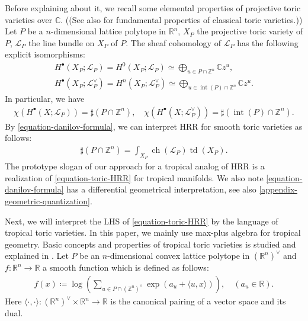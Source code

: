 \documentclass[a4paper,dvipdfmx,reqno,12pt]{amsart}
\theoremstyle{definition}
\newcommand{\deq}{\coloneqq}
\newcommand{\opn}[1]{\operatorname{#1}}
\newcommand{\abk}[1]{\langle {#1} \rangle}%
\numberwithin{equation}{section}
\begin{document}
Before explaining about it, we recall some 
elemental properties of projective toric varieties over 
$\mathbb{C}$.
((See also \cite{MR2810322} for fundamental
properties of classical toric varieties.))
Let $P$ be a $n$-dimensional lattice polytope in 
$\mathbb{R}^{n}$, $X_P$ the projective toric variety
of $P$, $\mathcal{L}_P$ the line bundle on 
$X_P$ of $P$.
The sheaf cohomology of $\mathcal{L}_P$ has 
the following explicit isomorphisms:
\begin{align}
H^{\bullet}(X_P;\mathcal{L}_P)=
H^{0}(X_P;\mathcal{L}_P)\simeq
\bigoplus_{u\in P\cap \mathbb{Z}^{n}} \mathbb{C}z^{u},
\label{equation-danilov-formula} \\
H^{\bullet}(X_P;\mathcal{L}_P^{\vee})=
H^{n}(X_P;\mathcal{L}_P^{\vee})\simeq 
\bigoplus_{u\in \opn{int}(P)\cap \mathbb{Z}^{n}}\mathbb{C}z^{u}.
\end{align}
In particular, we have
\begin{align} \label{equation-ehrhart-reciprocity}
\chi(H^{\bullet}(X;\mathcal{L}_P))=
\sharp (P\cap \mathbb{Z}^{n}), \quad 
\chi(H^{\bullet}(X;\mathcal{L}_P^{\vee}))=
\sharp (\opn{int}(P)\cap \mathbb{Z}^{n}).
\end{align}
By \cref{equation-danilov-formula}, we can interpret HRR 
for smooth toric varieties 
as follows:
\begin{align}
\label{equation-toric-HRR}
\sharp (P\cap \mathbb{Z}^{n})
=\int_{X_P}\opn{ch}(\mathcal{L}_P)\opn{td}(X_P).
\end{align}
The prototype slogan of our approach
for a tropical analog of HRR is 
a realization of \cref{equation-toric-HRR}
for tropical manifolds.
We also note \cref{equation-danilov-formula} 
has a differential geometrical interpretation,
see also \cref{appendix-geometric-quantization}. 


Next, we will interpret the LHS of 
\cref{equation-toric-HRR} by the language
of tropical toric varieties.
In this paper, we mainly use max-plus algebra for 
tropical geometry.
Basic concepts and properties 
of tropical toric varieties is studied and 
explained in \cite{MR2428356,MR2511632,meyer2011intersection,MR3287221}.
Let $P$ be an $n$-dimensional convex lattice polytope in
$(\mathbb{R}^{n})^{\vee}$ and
$f\colon \mathbb{R}^{n} \to \mathbb{R}$ a 
smooth function which is defined as follows:
\begin{align}
  f(x)\deq\log (\sum_{u\in P\cap (\mathbb{Z}^{n})^{\vee}} 
\opn{exp}(a_u+\abk{u,x})),\quad  (a_u\in \mathbb{R}).
\label{equation-log-polynomial} 
\end{align}
Here 
$\abk{\cdot,\cdot}\colon 
(\mathbb{R}^{n})^{\vee}\times \mathbb{R}^{n}\to\mathbb{R}$
is the canonical pairing of a vector space and its dual.
\end{document}
